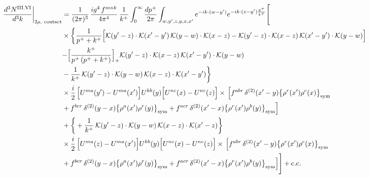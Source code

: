 \documentclass[9pt]{article}
\numberwithin{equation}{section}
\begin{document}
\begin{align}
\frac{d^{3}N^{\rm III.VI}}{d^{3}k}\bigg|_{2\rho,\ {\rm contact}}&=\frac{1}{(2\pi)^{3}}\,\frac{ig^{4}\,f^{mnk}}{4\pi^{4}}\,\frac{1}{k^{+}}\int_{0}^{\infty}\frac{dp^{+}}{2\pi}\int_{w,y',z,y,x,x'}e^{-ik\cdot{(w-y')}}e^{-ik\cdot{(z-y')}\frac{p^{+}}{k^{+}}}\Bigg[\notag\\
&\times\bigg\{\frac{1}{p^{+}+k^{+}}\Big[\mathcal{K}(y'-z)\cdot\mathcal{K}(x'-y')\,\mathcal{K}(y-w)\cdot\mathcal{K}(x-z)-\mathcal{K}(y'-z)\cdot\mathcal{K}(x-z)\,\mathcal{K}(x'-y')\cdot\mathcal{K}(y-w)\Big]\notag\\
&{-\Big[\frac{k^{+}}{p^{+}\,(p^{+}+k^{+})}\Big]_{+}\mathcal{K}(y'-z)\cdot\mathcal{K}(x-z)\,\mathcal{K}(x'-y')\cdot\mathcal{K}(y-w)}\notag\\
&-\frac{1}{k^{+}}\,\mathcal{K}(y'-z)\cdot\mathcal{K}(y-w)\,\mathcal{K}(x-z)\cdot\mathcal{K}(x'-y')\bigg\}\notag\\
&\times \frac{i}{2}\,\Big[U^{ma}(y')-U^{ma}(x')\Big]U^{kb}(y)\Big[U^{nc}(x)-U^{nc}(z)\Big]\times\,\Big[f^{abr}\,\delta^{(2)}(x'-y)\big\{\rho^{r}(x')\rho^{c}(x)\big\}_{\rm sym}\notag\\
& +f^{bcr}\,\delta^{(2)}(y-x)\big\{\rho^{a}(x')\rho^{r}(y)\big\}_{\rm sym} +f^{acr}\,\delta^{(2)}(x'-x)\big\{\rho^{r}(x')\rho^{b}(y)\big\}_{\rm sym}\Big]\notag\\
&+\bigg\{+\frac{1}{k^{+}}\,\mathcal{K}(y'-z)\cdot\mathcal{K}(y-w)\,\mathcal{K}(x-z)\cdot\mathcal{K}(x'-z)\bigg\}\notag\\
&\times \frac{i}{2}\,\Big[U^{ma}(z)-U^{ma}(x')\Big]U^{kb}(y)\Big[U^{nc}(x)-U^{nc}(z)\Big]\times\,\Big[f^{abr}\,\delta^{(2)}(x'-y)\big\{\rho^{r}(x')\rho^{c}(x)\big\}_{\rm sym}\notag\\
& +f^{bcr}\,\delta^{(2)}(y-x)\big\{\rho^{a}(x')\rho^{r}(y)\big\}_{\rm sym} +f^{acr}\,\delta^{(2)}(x'-x)\big\{\rho^{r}(x')\rho^{b}(y)\big\}_{\rm sym}\Big]\Bigg]+{\rm c.c.}\label{eq:D-III.VI-2}
\end{align}
\end{document}
